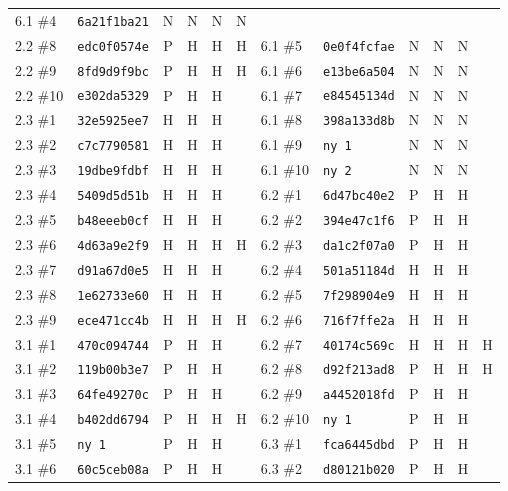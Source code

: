 {\begin{longtable}{@{}llcccc@{\hspace{2em}}llcccc@{}}
     6.1 \#4 & \texttt{6a21f1ba21} & N & N & N & N \\
    2.2 \#8 & \texttt{edc0f0574e} & P & H & H & H &
     6.1 \#5 & \texttt{0e0f4fcfae} & N & N & N &  \\
    2.2 \#9 & \texttt{8fd9d9f9bc} & P & H & H & H &
     6.1 \#6 & \texttt{e13be6a504} & N & N & N &  \\
    2.2 \#10 & \texttt{e302da5329} & P & H & H & &
     6.1 \#7 & \texttt{e84545134d} & N & N & N &  \\
    2.3 \#1 & \texttt{32e5925ee7} & H & H & H & &
     6.1 \#8 & \texttt{398a133d8b} & N & N & N &  \\
    2.3 \#2 & \texttt{c7c7790581} & H & H & H & &
     6.1 \#9 & \texttt{ny 1} & N & N & N &  \\
    2.3 \#3 & \texttt{19dbe9fdbf} & H & H & H & &
     6.1 \#10 & \texttt{ny 2} & N & N & N &  \\
    2.3 \#4 & \texttt{5409d5d51b} & H & H & H & &
     6.2 \#1 & \texttt{6d47bc40e2} & P & H & H &  \\
    2.3 \#5 & \texttt{b48eeeb0cf} & H & H & H & &
     6.2 \#2 & \texttt{394e47c1f6} & P & H & H &  \\
    2.3 \#6 & \texttt{4d63a9e2f9} & H & H & H & H &
     6.2 \#3 & \texttt{da1c2f07a0} & P & H & H &  \\
    2.3 \#7 & \texttt{d91a67d0e5} & H & H & H & &
     6.2 \#4 & \texttt{501a51184d} & H & H & H &  \\
    2.3 \#8 & \texttt{1e62733e60} & H & H & H & &
     6.2 \#5 & \texttt{7f298904e9} & H & H & H &  \\
    2.3 \#9 & \texttt{ece471cc4b} & H & H & H & H &
     6.2 \#6 & \texttt{716f7ffe2a} & H & H & H &  \\
    3.1 \#1 & \texttt{470c094744} & P & H & H & &
     6.2 \#7 & \texttt{40174c569c} & H & H & H & H \\
    3.1 \#2 & \texttt{119b00b3e7} & P & H & H & &
     6.2 \#8 & \texttt{d92f213ad8} & P & H & H & H \\
    3.1 \#3 & \texttt{64fe49270c} & P & H & H & &
     6.2 \#9 & \texttt{a4452018fd} & P & H & H &  \\
    3.1 \#4 & \texttt{b402dd6794} & P & H & H & H &
     6.2 \#10 & \texttt{ny 1} & P & H & H &  \\
    3.1 \#5 & \texttt{ny 1} & P & H & H & &
     6.3 \#1 & \texttt{fca6445dbd} & P & H & H &  \\
    3.1 \#6 & \texttt{60c5ceb08a} & P & H & H & &
     6.3 \#2 & \texttt{d80121b020} & P & H & H &  \\

\end{longtable}}
